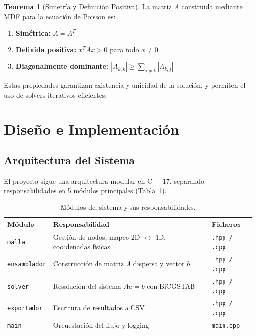 \documentclass[12pt,a4paper]{article}
\theoremstyle{definition}
\newtheorem{theorem}{Teorema}[section]
\begin{document}
\begin{theorem}[Simetr\'{i}a y Definici\'{o}n Positiva]
La matriz $A$ construida mediante MDF para la ecuaci\'{o}n de Poisson es:
\begin{enumerate}
    \item \textbf{Sim\'{e}trica:} $A = A^T$
    \item \textbf{Definida positiva:} $x^T A x > 0$ para todo $x \neq 0$
    \item \textbf{Diagonalmente dominante:} $|A_{k,k}| \geq \sum_{j \neq k} |A_{k,j}|$
\end{enumerate}
Estas propiedades garantizan existencia y unicidad de la soluci\'{o}n, y permiten el uso de solvers iterativos eficientes.
\end{theorem}

\section{Dise\~{n}o e Implementaci\'{o}n}\label{sec:implementacion}

\subsection{Arquitectura del Sistema}

El proyecto sigue una arquitectura modular en C++17, separando responsabilidades en 5 m\'{o}dulos principales (Tabla~\ref{tab:modulos}).

\begin{table}[H]
\centering
\caption{M\'{o}dulos del sistema y sus responsabilidades.}
\label{tab:modulos}
\begin{tabular}{@{}lp{6cm}l@{}}
\toprule
\textbf{M\'{o}dulo} & \textbf{Responsabilidad} & \textbf{Ficheros} \\
\midrule
\texttt{malla} & Gesti\'{o}n de nodos, mapeo 2D $\leftrightarrow$ 1D, coordenadas f\'{i}sicas & \texttt{.hpp / .cpp} \\
\texttt{ensamblador} & Construcci\'{o}n de matriz $A$ dispersa y vector $b$ & \texttt{.hpp / .cpp} \\
\texttt{solver} & Resoluci\'{o}n del sistema $Au = b$ con BiCGSTAB & \texttt{.hpp / .cpp} \\
\texttt{exportador} & Escritura de resultados a CSV & \texttt{.hpp / .cpp} \\
\texttt{main} & Orquestaci\'{o}n del flujo y logging & \texttt{main.cpp} \\
\bottomrule
\end{tabular}
\end{table}
\end{document}
